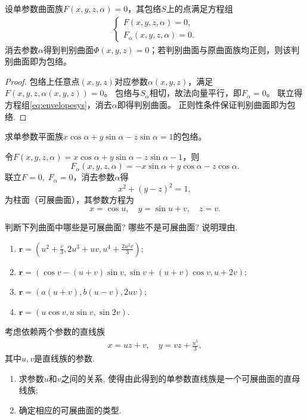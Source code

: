 \documentclass[../../main.tex]{subfiles}%
\begin{document}
\begin{proposition}
设单参数曲面族$F(x,y,z,\alpha)=0$，其包络$S$上的点满足方程组
\begin{align}
\begin{cases}
F(x,y,z,\alpha)=0,\\
F_\alpha(x,y,z,\alpha)=0.
\end{cases}
\label{eq:envelopesys}
\end{align}
消去参数$\alpha$得到判别曲面$\Phi(x,y,z)=0$；若判别曲面与原曲面族均正则，则该判别曲面即为包络。
\end{proposition}
\begin{proof}
包络上任意点$(x,y,z)$对应参数$\alpha(x,y,z)$，满足$F(x,y,z,\alpha(x,y,z))=0$。
包络与$S_\alpha$相切，故法向量平行，即$F_\alpha=0$。
联立得方程组\eqref{eq:envelopesys}，消去$\alpha$即得判别曲面。
正则性条件保证判别曲面即为包络.
\end{proof}

\begin{example}
求单参数平面族$x\cos\alpha+y\sin\alpha-z\sin\alpha=1$的包络。
\end{example}
\begin{solution}
令$F(x,y,z,\alpha)=x\cos\alpha+y\sin\alpha-z\sin\alpha-1$，则
$$F_\alpha(x,y,z,\alpha)=-x\sin\alpha+y\cos\alpha-z\cos\alpha.$$
联立$F=0,\;F_\alpha=0$，消去参数$\alpha$得
$$x^2+(y-z)^2=1,$$
为柱面（可展曲面），其参数方程为
$$x=\cos u,\quad y=\sin u+v,\quad z=v.$$

\end{solution}

\begin{example}
判断下列曲面中哪些是可展曲面? 哪些不是可展曲面? 说明理由.
\begin{enumerate}[(1)]
\item $\bm{r}=\left(u^2+\frac{v}{3},2u^3+uv,u^4+\frac{2u^2v}{3}\right)$;
\item $\bm{r}=(\cos v-(u+v)\sin v,\sin v+(u+v)\cos v,u+2v)$;
\item $\bm{r}=(a(u+v),b(u-v),2uv)$;
\item $\bm{r}=(u\cos v,u\sin v,\sin 2v)$.
\end{enumerate}
\end{example}

\begin{example}
考虑依赖两个参数的直线族
\begin{align*}
x=uz+v,\quad y=vz+\frac{u^3}{3},
\end{align*}
其中$u,v$是直线族的参数.
\begin{enumerate}[(1)]
\item 求参数$u$和$v$之间的关系, 使得由此得到的单参数直线族是一个可展曲面的直母线族;
\item 确定相应的可展曲面的类型.
\end{enumerate}
\end{example}
\end{document}
